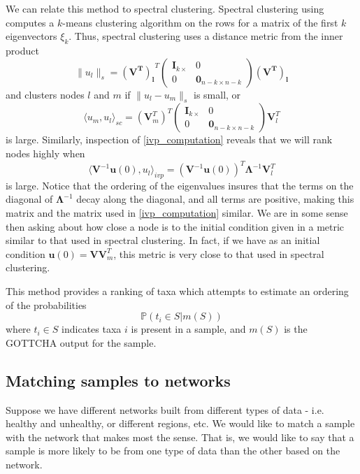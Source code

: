 \documentclass[10pt]{article}
\theoremstyle{definition}
\numberwithin{theorem}{section}
\numberwithin{definition}{section}
\numberwithin{lemma}{section}
\numberwithin{corollary}{section}
\numberwithin{clm}{section}
\numberwithin{rmk}{section}
\renewcommand{\b}{\bm}
\newcommand{\bP}{\mathbb{P}}
\begin{document}
We can relate this method to spectral clustering. Spectral clustering using computes a $k$-means clustering algorithm on the rows for a matrix of the first $k$ eigenvectors $\xi_k$. Thus, spectral clustering uses a distance metric from the inner product
\[
\|u_l\|_s = \b{(V^T)_l}^T \begin{pmatrix}
\b{I}_{k\times } & 0 \\
0 & \b{0}_{n-k \times n-k} 
\end{pmatrix}
\b{(V^T)_l}
\]
and clusters nodes $l$ and $m$ if $\|u_l- u_m\|_s$ is small, or
\begin{equation}
\langle u_m, u_l\rangle_{sc} = (\b{V}^T_m)^T \begin{pmatrix}
\b{I}_{k\times } & 0 \\
0 & \b{0}_{n-k \times n-k} 
\end{pmatrix}
\b{V}^T_l
\end{equation}
is large. Similarly, inspection of \cref{ivp_computation} reveals that we will rank nodes highly when
\begin{equation}
\langle \b{V}^{-1} \b{u}(0) , u_l\rangle_{ivp}  = (\b{V}^{-1}\b{u}(0))^T\b{\Lambda}^{-1} \b{V}^T_l
\end{equation}
is large.  Notice that the ordering of the eigenvalues insures that the terms on the diagonal of $\b{\Lambda}^{-1}$ decay along the diagonal, and all terms are positive, making this matrix and the matrix used in \cref{ivp_computation} similar. We are in some sense then asking about how close a node is to the initial condition given in a metric similar to that used in spectral clustering. In fact, if we have as an initial condition $\b{u}(0) = \b{V} \b{V}_m^T$, this metric is very close to that used in spectral clustering.

This method provides a ranking of taxa which attempts to estimate an ordering of the probabilities 
\[
\bP(t_i \in S | m(S))
\]
where $t_i \in S$ indicates taxa $i$ is present in a sample, and $m(S)$ is the GOTTCHA output for the sample.

\subsection{Matching samples to networks}

Suppose we have different networks built from different types of data - i.e. healthy and unhealthy, or different regions, etc. We would like to match a sample with the network that makes most the sense. That is, we would like to say that a sample is more likely to be from one type of data than the other based on the network.
\end{document}
